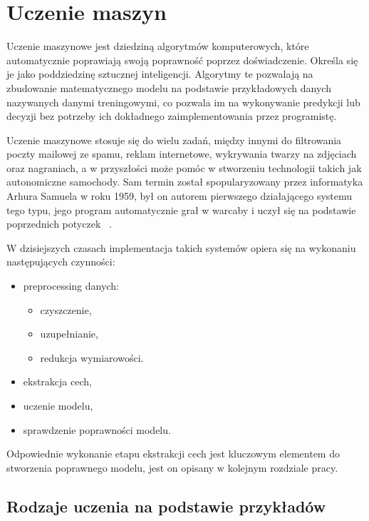 \chapter{Uczenie maszyn}
Uczenie maszynowe jest dziedziną algorytmów komputerowych, które automatycznie poprawiają swoją poprawność poprzez doświadczenie. 
Określa się je jako poddziedzinę sztucznej inteligencji. Algorytmy te pozwalają na zbudowanie matematycznego modelu na podstawie 
przykładowych danych nazywanych danymi treningowymi, co pozwala im na wykonywanie predykcji lub decyzji bez potrzeby ich dokładnego 
zaimplementowania przez programistę. 


Uczenie maszynowe stosuje się do wielu zadań, między innymi do filtrowania poczty mailowej ze spamu, reklam internetowe, 
wykrywania twarzy na zdjęciach oraz nagraniach, a w przyszłości może pomóc w stworzeniu technologii takich jak 
autonomiczne samochody. Sam termin został spopularyzowany przez informatyka Arhura Samuela w roku 1959, był on autorem pierwszego działającego 
systemu tego typu, jego program automatycznie grał w warcaby i uczył się na podstawie poprzednich potyczek ~\cite{MLBasics}. 


W dzisiejszych czasach implementacja takich systemów opiera się na wykonaniu następujących czynności:
\begin{itemize}
    \item preprocessing danych:
    \begin{itemize}
        \item czyszczenie,
        \item uzupełnianie,
        \item redukcja wymiarowości.
    \end{itemize}
    \item ekstrakcja cech,
    \item uczenie modelu,
    \item sprawdzenie poprawności modelu.
\end{itemize}
Odpowiednie wykonanie etapu ekstrakcji cech jest kluczowym elementem do stworzenia poprawnego modelu, jest
on opisany w kolejnym rozdziale pracy. 
\section{Rodzaje uczenia na podstawie przykładów}

